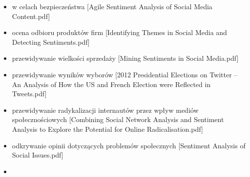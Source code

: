 \begin{itemize}
  \item w celach bezpieczeństwa [Agile Sentiment Analysis of Social Media
  Content.pdf]

  \item ocena odbioru produktów firm [Identifying Themes in Social Media and
  Detecting Sentiments.pdf]
  
  \item przewidywanie wielkości sprzedaży [Mining Sentiments in Social
  Media.pdf]
  
  \item przewidywanie wyników wyborów [2012 Presidential Elections on Twitter --
  An Analysis of How the US and French Election were Reflected in Tweets.pdf]
  
  \item przewidywanie radykalizacji internautów przez wpływ mediów
  społecznościowych [Combining Social Network Analysis and Sentiment Analysis to
  Explore the Potential for Online Radicalisation.pdf]
  
  \item odkrywanie opinii dotyczących problemów społecznych [Sentiment Analysis
  of Social Issues.pdf]
  
  \item 
\end{itemize}











